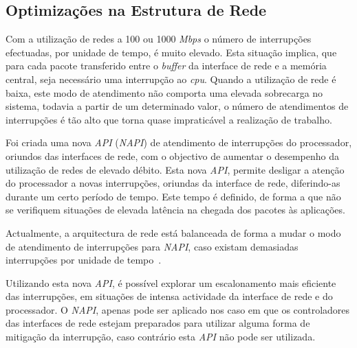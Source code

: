 %
%
%
%
%


\subsection{Optimizações na Estrutura de Rede}
\label{sub:napi}
Com a utilização de redes a 100 ou 1000 \textit{Mbps} o número de interrupções efectuadas, por unidade de tempo, é muito elevado.
Esta situação implica, que para cada pacote transferido entre o \textit{buffer} da interface de rede e a memória central, seja necessário uma interrupção ao \textit{cpu}.
Quando a utilização de rede é baixa, este modo de atendimento não comporta uma elevada sobrecarga no sistema, todavia a partir de um determinado valor, o número de atendimentos de interrupções é tão alto que torna quase impraticável a realização de trabalho.

Foi criada uma nova \textit{API} (\textit{NAPI}) de atendimento de interrupções do processador, oriundos das interfaces de rede, com o objectivo de aumentar o desempenho da utilização de redes de elevado débito.
Esta nova \textit{API}, permite desligar a atenção do processador a novas interrupções, oriundas da interface de rede, diferindo-as durante um certo período de tempo.
Este tempo é definido, de forma a que não se verifiquem situações de elevada latência na chegada dos pacotes às aplicações.

Actualmente, a arquitectura de rede está balanceada de forma a mudar o modo de atendimento de interrupções para \textit{NAPI}, caso existam demasiadas interrupções por unidade de tempo~\cite{administrator:napi}.

Utilizando esta nova \textit{API}, é possível explorar um escalonamento mais eficiente das interrupções, em situações de intensa actividade da interface de rede e do processador.
O \textit{NAPI}, apenas pode ser aplicado nos caso em que os controladores das interfaces de rede estejam preparados para utilizar alguma forma de mitigação da interrupção, caso contrário esta \textit{API} não pode ser utilizada.

